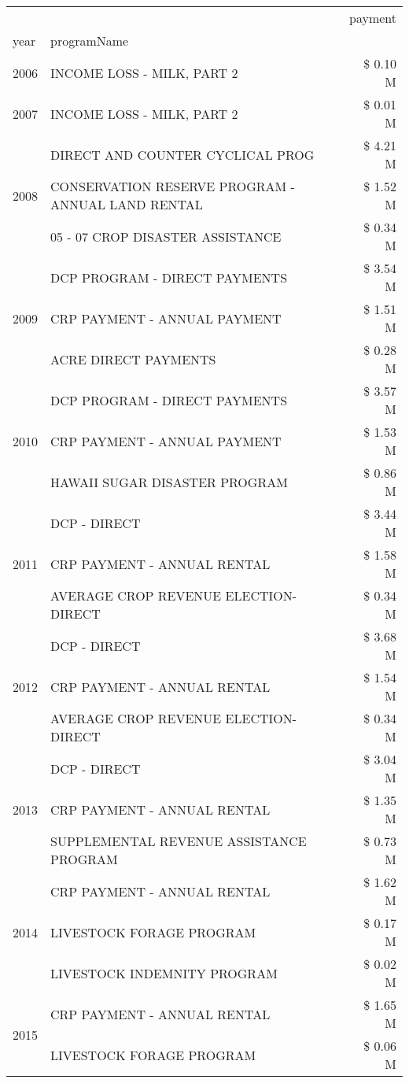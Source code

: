 \begin{tabular}{llr}
\toprule
 &  & payment \\
year & programName &  \\
\midrule
2006 & INCOME LOSS - MILK, PART 2 & \$ 0.10 M \\
\cline{1-3}
2007 & INCOME LOSS - MILK, PART 2 & \$ 0.01 M \\
\cline{1-3}
\multirow[t]{3}{*}{2008} & DIRECT AND COUNTER CYCLICAL PROG & \$ 4.21 M \\
 & CONSERVATION RESERVE PROGRAM - ANNUAL LAND RENTAL & \$ 1.52 M \\
 & 05 - 07 CROP DISASTER ASSISTANCE & \$ 0.34 M \\
\cline{1-3}
\multirow[t]{3}{*}{2009} & DCP PROGRAM - DIRECT PAYMENTS & \$ 3.54 M \\
 & CRP PAYMENT - ANNUAL PAYMENT & \$ 1.51 M \\
 & ACRE DIRECT PAYMENTS & \$ 0.28 M \\
\cline{1-3}
\multirow[t]{3}{*}{2010} & DCP PROGRAM - DIRECT PAYMENTS & \$ 3.57 M \\
 & CRP PAYMENT - ANNUAL PAYMENT & \$ 1.53 M \\
 & HAWAII SUGAR DISASTER PROGRAM & \$ 0.86 M \\
\cline{1-3}
\multirow[t]{3}{*}{2011} & DCP - DIRECT & \$ 3.44 M \\
 & CRP PAYMENT - ANNUAL RENTAL & \$ 1.58 M \\
 & AVERAGE CROP REVENUE ELECTION-DIRECT & \$ 0.34 M \\
\cline{1-3}
\multirow[t]{3}{*}{2012} & DCP - DIRECT & \$ 3.68 M \\
 & CRP PAYMENT - ANNUAL RENTAL & \$ 1.54 M \\
 & AVERAGE CROP REVENUE ELECTION-DIRECT & \$ 0.34 M \\
\cline{1-3}
\multirow[t]{3}{*}{2013} & DCP - DIRECT & \$ 3.04 M \\
 & CRP PAYMENT - ANNUAL RENTAL & \$ 1.35 M \\
 & SUPPLEMENTAL REVENUE ASSISTANCE PROGRAM & \$ 0.73 M \\
\cline{1-3}
\multirow[t]{3}{*}{2014} & CRP PAYMENT - ANNUAL RENTAL & \$ 1.62 M \\
 & LIVESTOCK FORAGE PROGRAM & \$ 0.17 M \\
 & LIVESTOCK INDEMNITY PROGRAM & \$ 0.02 M \\
\cline{1-3}
\multirow[t]{3}{*}{2015} & CRP PAYMENT - ANNUAL RENTAL & \$ 1.65 M \\
 & LIVESTOCK FORAGE PROGRAM & \$ 0.06 M \\

\end{tabular}
